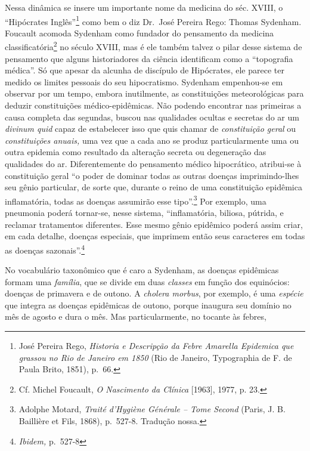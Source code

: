 Nessa dinâmica se insere um importante nome da medicina do séc. XVIII, o
``Hipócrates Inglês''\footnote{José Pereira Rego, \emph{Historia e
  Descripção da Febre Amarella Epidemica que grassou no Rio de Janeiro
  em 1850} (Rio de Janeiro, Typographia de F. de Paula Brito, 1851),
  p.~66.} como bem o diz Dr.~José Pereira Rego: Thomas Sydenham.
Foucault acomoda Sydenham como fundador do pensamento da medicina
classificatória\footnote{Cf. Michel Foucault, \emph{O Nascimento da
  Clínica} {[}1963{]}, 1977, p. 23.} no século XVIII, mas é ele também
talvez o pilar desse sistema de pensamento que alguns historiadores da
ciência identificam como a ``topografia médica''. Só que apesar da
alcunha de discípulo de Hipócrates, ele parece ter medido os limites
pessoais do seu hipocratismo. Sydenham empenhou-se em observar por um
tempo, embora inutilmente, as constituições meteorológicas para deduzir
constituições médico-epidêmicas. Não podendo encontrar nas primeiras a
causa completa das segundas, buscou nas qualidades ocultas e secretas do
ar um \emph{divinum quid} capaz de estabelecer isso que quis chamar de
\emph{constituição geral} ou \emph{constituições anuais,} uma vez que a
cada ano se produz particularmente uma ou outra epidemia como resultado
da alteração secreta ou degeneração das qualidades do ar. Diferentemente
do pensamento médico hipocrático, atribui-se à constituição geral ``o
poder de dominar todas as outras doenças imprimindo-lhes seu gênio
particular, de sorte que, durante o reino de uma constituição epidêmica
inflamatória, todas as doenças assumirão esse tipo''.\footnote{Adolphe
  Motard, \emph{Traité d'Hygiène Générale -- Tome Second} (Paris, J. B.
  Baillière et Fils, 1868), p.~527-8. Tradução nossa.} Por exemplo, uma
pneumonia poderá tornar-se, nesse sistema, ``inflamatória, biliosa,
pútrida, e reclamar tratamentos diferentes. Esse mesmo gênio epidêmico
poderá assim criar, em cada detalhe, doenças especiais, que imprimem
então seus caracteres em todas as doenças sazonais''.\footnote{\emph{Ibidem,}
  p.~527-8}

No vocabulário taxonômico que é caro a Sydenham, as doenças epidêmicas
formam uma \emph{família}, que se divide em duas \emph{classes} em
função dos equinócios: doenças de primavera e de outono. A \emph{cholera
morbus}, por exemplo, é uma \emph{espécie} que integra as doenças
epidêmicas de outono, porque inaugura seu domínio no mês de agosto e
dura o mês. Mas particularmente, no tocante às febres,

